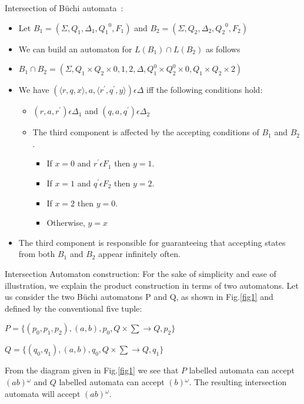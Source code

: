 \begin{definition}Intersection of B\"{u}chi automata~\cite{product}:
\begin{itemize}
 \item Let $B_1 = (\Sigma,Q_1,\Delta_1,{Q_1}^0,F_1)$ and $B_2 = (\Sigma,Q_2,\Delta_2,{Q_2}^0,F_2)$
 \item We can build an automaton for $L(B_1)\cap L(B_2)$ as follows
 \item $B_1 \cap B_2 = (\Sigma, Q_1 \times Q_2 \times {0,1,2},\Delta, Q^0_1 \times Q^0_2 \times
       {0}, Q_1 \times Q_2 \times {2})$
 \item We have $(\langle r,q,x \rangle,a,\langle r^{'},q^{'},y \rangle) \epsilon \Delta$ iff the 
       following conditions hold:
        \begin{itemize}
          \item $(r,a,r^{'}) \epsilon \Delta_1$ and $ (q,a,q^{'}) \epsilon \Delta_2$
          \item The third component is affected by the accepting conditions of $B_1$ and $B_2$.
            \begin{itemize}
             \item If $x = 0$ and $r^{'} \epsilon F_1$ then $y = 1$.
             \item If $x = 1$ and $q^{'} \epsilon F_2$ then $y = 2$.
             \item If $x = 2$ then $y = 0$.
             \item Otherwise, $y = x$
            \end{itemize}

        \end{itemize}
 \item The third component is responsible for guaranteeing that accepting states from both $B_1$ and
       $B_2$ appear infinitely often.
\end{itemize}
\end{definition}

\noindent
Intersection Automaton construction:
\noindent
For the sake of simplicity and ease of illustration, 
we explain the product construction in terms of two automatons. 
Let us consider the two B\"{u}chi automatons P and Q, as shown in Fig.\ref{fig1} and defined by the
conventional five tuple:

$P = \{(p_0,p_1,p_2),(a,b),p_0, Q \times \sum \rightarrow Q,p_2\}$

$Q = \{(q_0,q_1),(a,b),q_0, Q \times \sum \rightarrow Q,q_1\}$

From the diagram given in Fig.\ref{fig1} we see that $P$ labelled automata can accept $(ab){^\omega}$ 
and $Q$ labelled automata can accept $(b){^\omega}$. The resulting intersection automata will accept
$(ab){^\omega}$.

